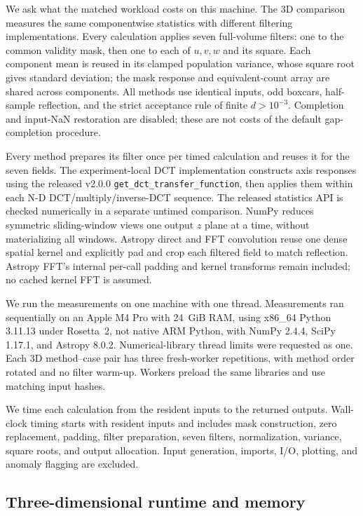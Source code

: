 \documentclass[a4paper,fleqn]{cas-sc}
\begin{document}
We ask what the matched workload costs on this machine. The 3D comparison measures the same componentwise statistics with different filtering implementations. Every calculation applies seven full-volume filters: one to the common validity mask, then one to each of $u,v,w$ and its square. Each component mean is reused in its clamped population variance, whose square root gives standard deviation; the mask response and equivalent-count array are shared across components. All methods use identical inputs, odd boxcars, half-sample reflection, and the strict acceptance rule of finite $d>10^{-3}$. Completion and input-NaN restoration are disabled; these are not costs of the default gap-completion procedure.

Every method prepares its filter once per timed calculation and reuses it for the seven fields. The experiment-local DCT implementation constructs axis responses using the released v2.0.0 \texttt{get\_dct\_transfer\_function}, then applies them within each N-D DCT/multiply/inverse-DCT sequence. The released statistics API is checked numerically in a separate untimed comparison. NumPy reduces symmetric sliding-window views one output $z$ plane at a time, without materializing all windows. Astropy direct and FFT convolution reuse one dense spatial kernel and explicitly pad and crop each filtered field to match reflection. Astropy FFT's internal per-call padding and kernel transforms remain included; no cached kernel FFT is assumed.

We run the measurements on one machine with one thread. Measurements ran sequentially on an Apple M4 Pro with 24~GiB RAM, using x86\_64 Python 3.11.13 under Rosetta~2, not native ARM Python, with NumPy 2.4.4, SciPy 1.17.1, and Astropy 8.0.2. Numerical-library thread limits were requested as one. Each 3D method--case pair has three fresh-worker repetitions, with method order rotated and no filter warm-up. Workers preload the same libraries and use matching input hashes.

We time each calculation from the resident inputs to the returned outputs. Wall-clock timing starts with resident inputs and includes mask construction, zero replacement, padding, filter preparation, seven filters, normalization, variance, square roots, and output allocation. Input generation, imports, I/O, plotting, and anomaly flagging are excluded.

\subsection{Three-dimensional runtime and memory}
\label{sec:benchmark_memory}
\end{document}
